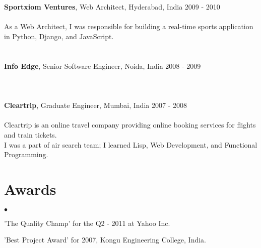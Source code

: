 \documentclass[margin, line, 10pt]{res}
\newenvironment{list2}{
  \begin{list}{$\bullet$}{%
      \setlength{\itemsep}{0in}
      \setlength{\parsep}{0in} \setlength{\parskip}{0in}
      \setlength{\topsep}{0in} \setlength{\partopsep}{0in}
      \setlength{\leftmargin}{0.2in}}}{\end{list}}
\begin{document}
\begin{resume}
\section{}
{\Large {\bf Sportxiom Ventures}}, Web Architect, Hyderabad, India  \hfill 2009 - 2010\\
\vspace{-.3cm}\\
As a Web Architect, I was responsible for building a real-time sports application in Python, Django,
and JavaScript.
\vspace{.05cm}

\section{}
{\Large {\bf Info Edge}}, Senior Software Engineer, Noida, India \hfill 2008 - 2009 \\
\vspace{-.3cm}\\
\vspace{.05cm}


\section{}
{\Large {\bf Cleartrip}}, Graduate Engineer,  Mumbai, India \hfill 2007 - 2008\\
\vspace{-.3cm}\\
Cleartrip is an online travel company providing online booking services for flights and train tickets.\\
I was a part of air search team; I learned Lisp, Web Development,
and Functional Programming.
\vspace{.05cm}

\section{Awards}
\begin{list2}
\item 'The Quality Champ' for the Q2 - 2011 at Yahoo Inc.
\item 'Best Project Award' for 2007, Kongu Engineering College, India.
\end{list2}

\end{resume}
\end{document}
